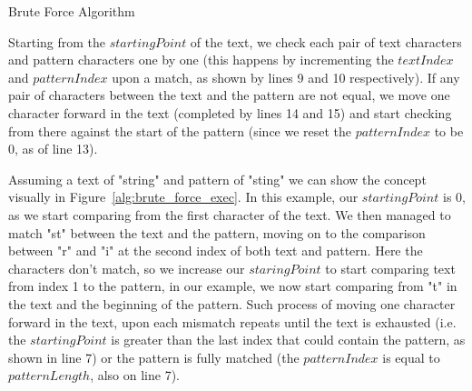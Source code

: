 \begin{algorithm}[t]
    \DontPrintSemicolon

\caption{Brute Force Algorithm}
\label{alg:brute_force}
\end{algorithm}

Starting from the $\mathit{startingPoint}$ of the text, we check each pair of text characters and pattern characters one by one (this happens by incrementing the $\mathit{textIndex}$ and $\mathit{patternIndex}$ upon a match, as shown by lines 9 and 10 respectively). If any pair of characters between the text and the pattern are not equal, we move one character forward in the text (completed by lines 14 and 15) and start checking from there against the start of the pattern (since we reset the $\mathit{patternIndex}$ to be 0, as of line 13).

Assuming a text of "string" and pattern of "sting" we can show the concept visually in Figure~\ref{alg:brute_force_exec}. In this example, our $startingPoint$ is 0, as we start comparing from the first character of the text. We then managed to match "st" between the text and the pattern, moving on to the comparison between "r" and "i" at the second index of both text and pattern. Here the characters don't match, so we increase our $staringPoint$ to start comparing text from index 1 to the pattern, in our example, we now start comparing from "t" in the text and the beginning of the pattern. Such process of moving one character forward in the text, upon each mismatch repeats until the text is exhausted (i.e. the $startingPoint$ is greater than the last index that could contain the pattern, as shown in line 7) or the pattern is fully matched (the $patternIndex$ is equal to $patternLength$, also on line 7).

